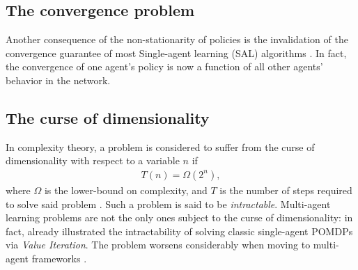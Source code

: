 \subsection{The convergence problem}
Another consequence of the non-stationarity of policies is the invalidation of the convergence guarantee of most Single-agent learning (SAL) algorithms \cite{nonstation, convergence}. In fact, the convergence of one agent's policy is now a function of all other agents' behavior in the network.

\subsection{The curse of dimensionality}
In complexity theory, a problem is considered to suffer from the curse of dimensionality with respect to a variable $n$ if
\begin{align}
    \label{eq:intract}
    T(n) = \Omega(2^n),
\end{align}
where $\Omega$ is the lower-bound on complexity, and $T$ is the number of steps required to solve said problem \cite{cursedim2}. Such a problem is said to be \textit{intractable}. Multi-agent learning problems are not the only ones subject to the curse of dimensionality: in fact,  already illustrated the intractability of solving classic single-agent POMDPs via \textit{Value Iteration}. The problem worsens considerably when moving to multi-agent frameworks \cite{cursedim}.


